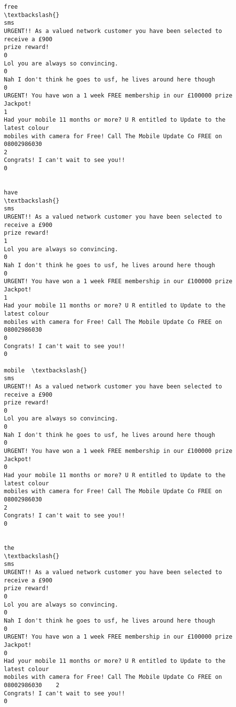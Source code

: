 \documentclass[11pt]{article}
\makeatletter
\newcommand{\boxspacing}{\kern\kvtcb@left@rule\kern\kvtcb@boxsep}
\newcommand{\prompt}[4]{
        {\ttfamily\llap{{\color{#2}[#3]:\hspace{3pt}#4}}\vspace{-\baselineskip}}
    }
\makeatother
\begin{document}
            \begin{tcolorbox}[breakable, size=fbox, boxrule=.5pt, pad at break*=1mm, opacityfill=0]
\prompt{Out}{outcolor}{98}{\boxspacing}
\begin{Verbatim}[commandchars=\\\{\}]
                                                                            free
\textbackslash{}
sms
URGENT!! As a valued network customer you have been selected to receive a £900
prize reward!
0
Lol you are always so convincing.
0
Nah I don't think he goes to usf, he lives around here though
0
URGENT! You have won a 1 week FREE membership in our £100000 prize Jackpot!
1
Had your mobile 11 months or more? U R entitled to Update to the latest colour
mobiles with camera for Free! Call The Mobile Update Co FREE on 08002986030
2
Congrats! I can't wait to see you!!
0

                                                                            have
\textbackslash{}
sms
URGENT!! As a valued network customer you have been selected to receive a £900
prize reward!
1
Lol you are always so convincing.
0
Nah I don't think he goes to usf, he lives around here though
0
URGENT! You have won a 1 week FREE membership in our £100000 prize Jackpot!
1
Had your mobile 11 months or more? U R entitled to Update to the latest colour
mobiles with camera for Free! Call The Mobile Update Co FREE on 08002986030
0
Congrats! I can't wait to see you!!
0

mobile  \textbackslash{}
sms
URGENT!! As a valued network customer you have been selected to receive a £900
prize reward!
0
Lol you are always so convincing.
0
Nah I don't think he goes to usf, he lives around here though
0
URGENT! You have won a 1 week FREE membership in our £100000 prize Jackpot!
0
Had your mobile 11 months or more? U R entitled to Update to the latest colour
mobiles with camera for Free! Call The Mobile Update Co FREE on 08002986030
2
Congrats! I can't wait to see you!!
0

                                                                            the
\textbackslash{}
sms
URGENT!! As a valued network customer you have been selected to receive a £900
prize reward!                                                                  0
Lol you are always so convincing.
0
Nah I don't think he goes to usf, he lives around here though
0
URGENT! You have won a 1 week FREE membership in our £100000 prize Jackpot!
0
Had your mobile 11 months or more? U R entitled to Update to the latest colour
mobiles with camera for Free! Call The Mobile Update Co FREE on 08002986030    2
Congrats! I can't wait to see you!!
0


\end{Verbatim}
\end{tcolorbox}
\end{document}
